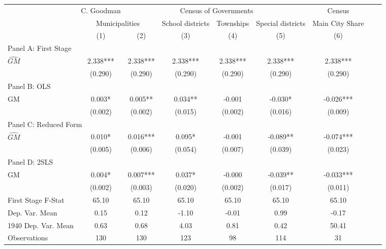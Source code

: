  \begin{tabular}{l*{8}{c}} \toprule
&\multicolumn{1}{c}{C. Goodman}&\multicolumn{4}{c}{Census of Governments}&\multicolumn{1}{c}{Census}\\\cmidrule(lr){2-2}\cmidrule(lr){3-6}\cmidrule(lr){7-7}
&\multicolumn{2}{c}{Municipalities}&\multicolumn{1}{c}{School districts}&\multicolumn{1}{c}{Townships}&\multicolumn{1}{c}{Special districts}&\multicolumn{1}{c}{Main City Share}\\\cmidrule(lr){2-3}\cmidrule(lr){4-6}\cmidrule(lr){7-7}
&\multicolumn{1}{c}{(1)}&\multicolumn{1}{c}{(2)}&\multicolumn{1}{c}{(3)}&\multicolumn{1}{c}{(4)}&\multicolumn{1}{c}{(5)}&\multicolumn{1}{c}{(6)}\\
\cmidrule(lr){1-7}
\multicolumn{6}{l}{Panel A: First Stage}\\
\cmidrule(lr){1-7}
$\widehat{GM}$  &    2.338***&    2.338***&    2.338***&    2.338***&    2.338***&    2.338***\\
                &  (0.290)   &  (0.290)   &  (0.290)   &  (0.290)   &  (0.290)   &  (0.290)   \\
\cmidrule(lr){1-7}
\multicolumn{6}{l}{Panel B: OLS}\\
\cmidrule(lr){1-7}
GM              &    0.003*  &    0.005** &    0.034** &   -0.001   &   -0.030*  &   -0.026***\\
                &  (0.002)   &  (0.002)   &  (0.015)   &  (0.002)   &  (0.016)   &  (0.009)   \\
\cmidrule(lr){1-7}
\multicolumn{6}{l}{Panel C: Reduced Form}\\
\cmidrule(lr){1-7}
$\widehat{GM}$  &    0.010*  &    0.016***&    0.095*  &   -0.001   &   -0.089** &   -0.074***\\
                &  (0.005)   &  (0.006)   &  (0.054)   &  (0.007)   &  (0.039)   &  (0.023)   \\
\cmidrule(lr){1-7}
\multicolumn{6}{l}{Panel D: 2SLS}\\
\cmidrule(lr){1-7}
GM              &    0.004*  &    0.007***&    0.037*  &   -0.000   &   -0.039** &   -0.033***\\
                &  (0.002)   &  (0.003)   &  (0.020)   &  (0.002)   &  (0.017)   &  (0.011)   \\
\midrule
First Stage F-Stat&    65.10   &    65.10   &    65.10   &    65.10   &    65.10   &    65.10   \\
Dep. Var. Mean  &     0.15   &     0.12   &    -1.10   &    -0.01   &     0.99   &    -0.17   \\
1940 Dep. Var. Mean&     0.63   &     0.68   &     4.03   &     0.81   &     0.42   &    50.41   \\
Observations    &      130   &      130   &      123   &       98   &      114   &       31   \\
       \bottomrule \end{tabular}
